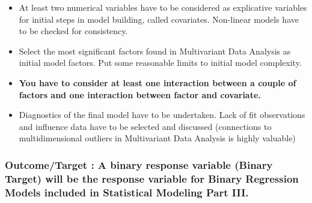 \documentclass[
  18pt,
  a4paper]{article}
\providecommand{\tightlist}{%
  \setlength{\itemsep}{0pt}\setlength{\parskip}{0pt}}
\begin{document}
\begin{itemize}
\tightlist
\item
  At least two numerical variables have to be considered as explicative
  variables for initial steps in model building, called covariates.
  Non-linear models have to be checked for consistency.
\item
  Select the most significant factors found in Multivariant Data
  Analysis as initial model factors. Put some reasonable limits to
  initial model complexity.
\item
  \textbf{You have to consider at least one interaction between a couple
  of factors and one interaction between factor and covariate.}
\item
  Diagnostics of the final model have to be undertaken. Lack of fit
  observations and influence data have to be selected and discussed
  (connections to multidimensional outliers in Multivariant Data
  Analysis is highly valuable)
\end{itemize}

\hypertarget{outcometarget-a-binary-response-variable-binary-target-will-be-the-response-variable-for-binary-regression-models-included-in-statistical-modeling-part-iii.}{%
\subsubsection{Outcome/Target : A binary response variable (Binary
Target) will be the response variable for Binary Regression Models
included in Statistical Modeling Part
III.}\label{outcometarget-a-binary-response-variable-binary-target-will-be-the-response-variable-for-binary-regression-models-included-in-statistical-modeling-part-iii.}}
\end{document}
